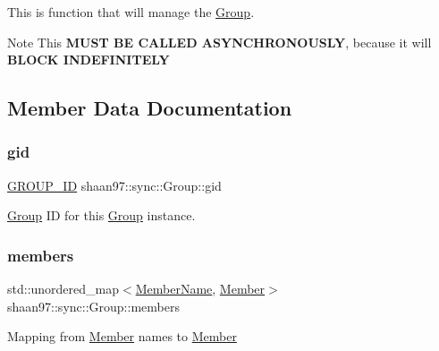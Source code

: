 This is function that will manage the \hyperlink{classshaan97_1_1sync_1_1_group}{Group}. \begin{DoxyNote}{Note}
This {\bfseries M\+U\+ST BE C\+A\+L\+L\+ED A\+S\+Y\+N\+C\+H\+R\+O\+N\+O\+U\+S\+LY}, because it will {\bfseries B\+L\+O\+CK I\+N\+D\+E\+F\+I\+N\+I\+T\+E\+LY} 
\end{DoxyNote}


\subsection{Member Data Documentation}
\mbox{\label{classshaan97_1_1sync_1_1_group_a91de861ecc3bde21758b99e98ec08112}} 
\subsubsection{\texorpdfstring{gid}{gid}}
{\footnotesize\ttfamily \hyperlink{namespaceshaan97_1_1sync_a34cebf175d27dfc3d82f24608f7043c1}{G\+R\+O\+U\+P\+\_\+\+ID} shaan97\+::sync\+::\+Group\+::gid\hspace{0.3cm}{\ttfamily [private]}}



\hyperlink{classshaan97_1_1sync_1_1_group}{Group} ID for this {\ttfamily \hyperlink{classshaan97_1_1sync_1_1_group}{Group}} instance. 

\mbox{\label{classshaan97_1_1sync_1_1_group_ac285f584893e954872679670c2092fda}} 
\subsubsection{\texorpdfstring{members}{members}}
{\footnotesize\ttfamily std\+::unordered\+\_\+map$<$\hyperlink{namespaceshaan97_1_1sync_af59c2c9185f7cde547b79fbe0bf8ec71}{Member\+Name}, \hyperlink{classshaan97_1_1sync_1_1_member}{Member}$>$ shaan97\+::sync\+::\+Group\+::members\hspace{0.3cm}{\ttfamily [private]}}

Mapping from \hyperlink{classshaan97_1_1sync_1_1_member}{Member} names to \hyperlink{classshaan97_1_1sync_1_1_member}{Member}

